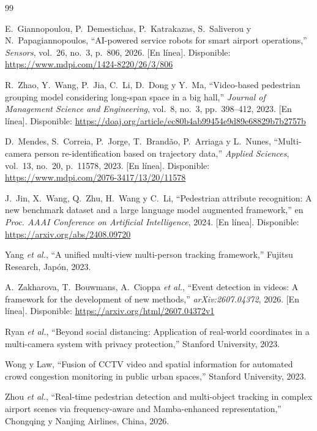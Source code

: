 \documentclass[12pt,a4paper]{article}
\begin{document}
\begingroup
\renewcommand{\section}[2]{}
\begin{thebibliography}{99}

E.~Giannopoulou, P.~Demestichas, P.~Katrakazas, S.~Saliverou y
N.~Papagiannopoulos, ``AI-powered service robots for smart airport
operations,'' \textit{Sensors}, vol.~26, no.~3, p.~806, 2026. [En
línea]. Disponible: \url{https://www.mdpi.com/1424-8220/26/3/806}

R.~Zhao, Y.~Wang, P.~Jia, C.~Li, D.~Dong y Y.~Ma, ``Video-based
pedestrian grouping model considering long-span space in a big hall,''
\textit{Journal of Management Science and Engineering}, vol.~8, no.~3,
pp.~398--412, 2023. [En línea]. Disponible:
\url{https://doaj.org/article/ec80b4ab99454e9d89e68829b7b2757b}

D.~Mendes, S.~Correia, P.~Jorge, T.~Brandão, P.~Arriaga y L.~Nunes,
``Multi-camera person re-identification based on trajectory data,''
\textit{Applied Sciences}, vol.~13, no.~20, p.~11578, 2023. [En línea].
Disponible: \url{https://www.mdpi.com/2076-3417/13/20/11578}

J.~Jin, X.~Wang, Q.~Zhu, H.~Wang y C.~Li, ``Pedestrian attribute
recognition: A new benchmark dataset and a large language model augmented
framework,'' en \textit{Proc. AAAI Conference on Artificial
Intelligence}, 2024. [En línea]. Disponible:
\url{https://arxiv.org/abs/2408.09720}

Yang \textit{et al.}, ``A unified multi-view multi-person tracking
framework,'' Fujitsu Research, Japón, 2023.

A.~Zakharova, T.~Bouwmans, A.~Cioppa \textit{et al.}, ``Event detection
in videos: A framework for the development of new methods,''
\textit{arXiv:2607.04372}, 2026. [En línea]. Disponible:
\url{https://arxiv.org/html/2607.04372v1}

Ryan \textit{et al.}, ``Beyond social distancing: Application of
real-world coordinates in a multi-camera system with privacy
protection,'' Stanford University, 2023.

Wong y Law, ``Fusion of CCTV video and spatial information for automated
crowd congestion monitoring in public urban spaces,'' Stanford
University, 2023.

Zhou \textit{et al.}, ``Real-time pedestrian detection and multi-object
tracking in complex airport scenes via frequency-aware and
Mamba-enhanced representation,'' Chongqing y Nanjing Airlines, China,
2026.


\end{thebibliography}
\end{document}
